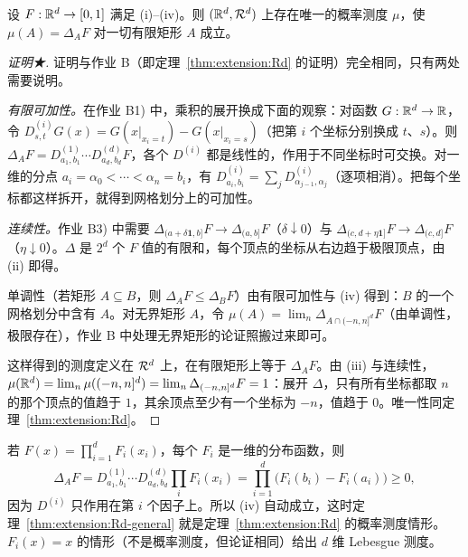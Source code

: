 \begin{theorem}\label{thm:extension:Rd-general}
设 $F:\mathbb{R}^d\to[0,1]$ 满足 (i)--(iv)。则 $(\mathbb{R}^d,\mathcal{R}^d)$ 上存在唯一的概率测度 $\mu$，使 $\mu(A)=\Delta_AF$ 对一切有限矩形 $A$ 成立。
\end{theorem}
\begin{proof}[证明★]
证明与作业 B（即定理~\ref{thm:extension:Rd} 的证明）完全相同，只有两处需要说明。

\emph{有限可加性。}在作业 B1) 中，乘积的展开换成下面的观察：对函数 $G:\mathbb{R}^d\to\mathbb{R}$，令 $D^{(i)}_{s,t}G(x)=G(x|_{x_i=t})-G(x|_{x_i=s})$（把第 $i$ 个坐标分别换成 $t$、$s$）。则 $\Delta_AF=D^{(1)}_{a_1,b_1}\cdots D^{(d)}_{a_d,b_d}F$，各个 $D^{(i)}$ 都是线性的，作用于不同坐标时可交换。对一维的分点 $a_i=\alpha_0<\cdots<\alpha_n=b_i$，有 $D^{(i)}_{a_i,b_i}=\sum_jD^{(i)}_{\alpha_{j-1},\alpha_j}$（逐项相消）。把每个坐标都这样拆开，就得到网格划分上的可加性。

\emph{连续性。}作业 B3) 中需要 $\Delta_{(a+\delta\mathbf 1,b]}F\to\Delta_{(a,b]}F$（$\delta\downarrow0$）与 $\Delta_{(c,d+\eta\mathbf 1]}F\to\Delta_{(c,d]}F$（$\eta\downarrow0$）。$\Delta$ 是 $2^d$ 个 $F$ 值的有限和，每个顶点的坐标从右边趋于极限顶点，由 (ii) 即得。

单调性（若矩形 $A\subseteq B$，则 $\Delta_AF\leqslant\Delta_BF$）由有限可加性与 (iv) 得到：$B$ 的一个网格划分中含有 $A$。对无界矩形 $A$，令 $\mu(A)=\lim_n\Delta_{A\cap(-n,n]^d}F$（由单调性，极限存在），作业 B 中处理无界矩形的论证照搬过来即可。

这样得到的测度定义在 $\mathcal{R}^d$ 上，在有限矩形上等于 $\Delta_AF$。由 (iii) 与连续性，$\mu(\mathbb{R}^d)=\lim_n\mu((-n,n]^d)=\lim_n\Delta_{(-n,n]^d}F=1$：展开 $\Delta$，只有所有坐标都取 $n$ 的那个顶点的值趋于 $1$，其余顶点至少有一个坐标为 $-n$，值趋于 $0$。唯一性同定理~\ref{thm:extension:Rd}。
\end{proof}

\begin{example}[乘积型]
若 $F(x)=\prod_{i=1}^dF_i(x_i)$，每个 $F_i$ 是一维的分布函数，则
\[
\Delta_AF=D^{(1)}_{a_1,b_1}\cdots D^{(d)}_{a_d,b_d}\prod_iF_i(x_i)=\prod_{i=1}^d\bigl(F_i(b_i)-F_i(a_i)\bigr)\geqslant0,
\]
因为 $D^{(i)}$ 只作用在第 $i$ 个因子上。所以 (iv) 自动成立，这时定理~\ref{thm:extension:Rd-general} 就是定理~\ref{thm:extension:Rd} 的概率测度情形。$F_i(x)=x$ 的情形（不是概率测度，但论证相同）给出 $d$ 维 Lebesgue 测度。
\end{example}


